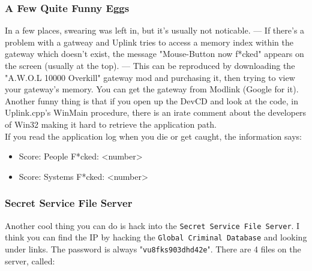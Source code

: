 \documentclass[11pt,twoside,a4paper]{book}
\begin{document}
{\small
\subsubsection{A Few Quite Funny Eggs}

In a few places, swearing was left in, but it's usually not noticable. --- If there's a problem with a gatweay and Uplink tries to access a memory index within the gateway which doesn't exist, the message "Mouse-Button now f*cked" appears on the screen (usually at the top). --- This can be reproduced by downloading the "A.W.O.L 10000 Overkill" gateway mod and purchasing it, then trying to view your gateway's memory. You can get the gateway from Modlink (Google for it).  ~\\

Another funny thing is that if you open up the DevCD and look at the code, in Uplink.cpp's WinMain procedure, there is an irate comment about the developers of Win32 making it hard to retrieve the application path. ~\\

If you read the application log when you die or get caught, the information says:
\begin{itemize}
	\setlength{\itemsep}{1pt}
	\setlength{\parskip}{0pt}
	\setlength{\parsep}{0pt}
	
	\item Score: People F*cked: <number>
	\item Score: Systems F*cked: <number>
\end{itemize} %

\subsubsection{Secret Service File Server}
	
Another cool thing you can do is hack into the \texttt{Secret Service File Server}. I think you can find the IP by hacking the \texttt{Global Criminal Database} and looking under links. The password is always "\texttt{vu8fks903dhd42e}". There are 4 files on the server, called: ~\\ 
\begin{minipage}[ht]{1.50cm} ~\\ \end{minipage} \hfill \begin{minipage}[ht]{15.00cm}
	\begin{itemize}
		\setlength{\itemsep}{1pt}
		\setlength{\parskip}{0pt}
		\setlength{\parsep}{0pt}
	

\end{itemize}
\end{minipage}}
\end{document}
